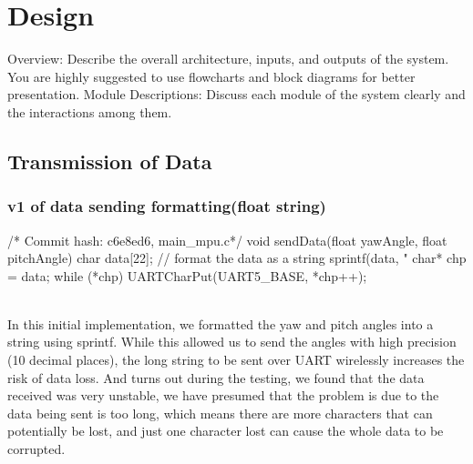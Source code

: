 \documentclass[12pt, a4paper]{article}
\begin{document}
\section{Design}
Overview: Describe the overall architecture, inputs, and outputs of the
system.
You are highly suggested to use flowcharts and block diagrams for
better presentation.
Module Descriptions: Discuss each module of the system clearly and
the interactions among them.

\subsection{Transmission of Data}
\subsubsection{v1 of data sending formatting(float string)}\text{}
\begin{code}[language=c]
/* Commit hash: c6e8ed6, main_mpu.c*/
void sendData(float yawAngle, float pitchAngle) {
    char data[22];
    // format the data as a string
    sprintf(data, "%
    char* chp = data;
    while (*chp) 
        UARTCharPut(UART5_BASE, *chp++);
}
\end{code}\text{}\\
In this initial implementation, we formatted the yaw and pitch angles into a string using sprintf. 
While this allowed us to send the angles with high precision (10 decimal places), 
the long string to be sent over UART wirelessly increases the risk of data loss. And turns out during the testing, 
we found that the data received was very unstable, we have presumed that the problem is due to the data being sent is too long, 
which means there are more characters that can potentially be lost, and just one character lost can cause the whole data to be corrupted.
\end{document}
